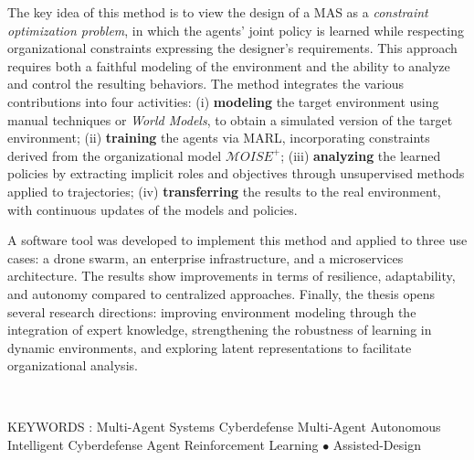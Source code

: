 The key idea of this method is to view the design of a MAS as a \textit{constraint optimization problem}, in which the agents' joint policy is learned while respecting organizational constraints expressing the designer's requirements. This approach requires both a faithful modeling of the environment and the ability to analyze and control the resulting behaviors.
%
The method integrates the various contributions into four activities: (i) \textbf{modeling} the target environment using manual techniques or \textit{World Models}, to obtain a simulated version of the target environment; (ii) \textbf{training} the agents via MARL, incorporating constraints derived from the organizational model $\mathcal{M}OISE^+$; (iii) \textbf{analyzing} the learned policies by extracting implicit roles and objectives through unsupervised methods applied to trajectories; (iv) \textbf{transferring} the results to the real environment, with continuous updates of the models and policies.

A software tool was developed to implement this method and applied to three use cases: a drone swarm, an enterprise infrastructure, and a microservices architecture. The results show improvements in terms of resilience, adaptability, and autonomy compared to centralized approaches.
%
Finally, the thesis opens several research directions: improving environment modeling through the integration of expert knowledge, strengthening the robustness of learning in dynamic environments, and exploring latent representations to facilitate organizational analysis.

\medskip

\

\noindent KEYWORDS :
Multi-Agent Systems \raisebox{0.25ex}{\tiny$\bullet$} Cyberdefense \raisebox{0.25ex}{\tiny$\bullet$} Multi-Agent \raisebox{0.25ex}{\tiny$\bullet$} Autonomous Intelligent Cyberdefense Agent Reinforcement Learning {\tiny$\bullet$} Assisted-Design

\endgroup

\vfill